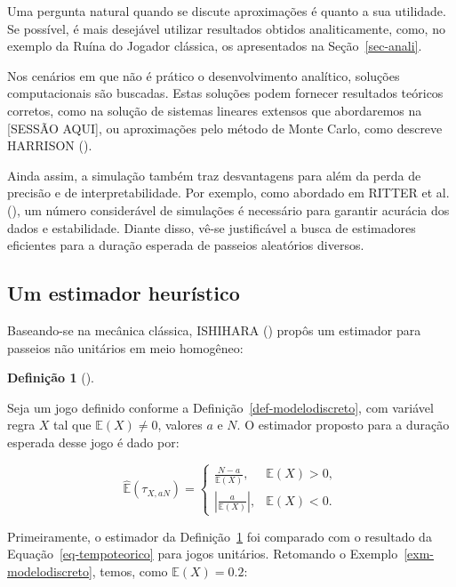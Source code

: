 \documentclass[
  brazilian,
  12pt,
]{article}
\theoremstyle{definition}
\theoremstyle{definition}
\newtheorem{definition}{Definição}[section]
\theoremstyle{remark}
\begin{document}
Uma pergunta natural quando se discute aproximações é quanto a sua
utilidade. Se possível, é mais desejável utilizar resultados obtidos
analiticamente, como, no exemplo da Ruína do Jogador clássica, os
apresentados na Seção~\ref{sec-anali}.

Nos cenários em que não é prático o desenvolvimento analítico, soluções
computacionais são buscadas. Estas soluções podem fornecer resultados
teóricos corretos, como na solução de sistemas lineares extensos que
abordaremos na {[}SESSÃO AQUI{]}, ou aproximações pelo método de Monte
Carlo, como descreve HARRISON
().

Ainda assim, a simulação também traz desvantagens para além da perda de
precisão e de interpretabilidade. Por exemplo, como abordado em RITTER
et al. (), um número
considerável de simulações é necessário para garantir acurácia dos dados
e estabilidade. Diante disso, vê-se justificável a busca de estimadores
eficientes para a duração esperada de passeios aleatórios diversos.

\subsection{Um estimador heurístico}\label{um-estimador-heuruxedstico}

Baseando-se na mecânica clássica, ISHIHARA
() propôs um estimador para
passeios não unitários em meio homogêneo:

\begin{definition}[]\protect\hypertarget{def-estimadorsimples}{}\label{def-estimadorsimples}

Seja um jogo definido conforme a Definição~\ref{def-modelodiscreto}, com
variável regra \(X\) tal que \(\mathbb{E}(X) \neq 0\), valores \(a\) e
\(N\). O estimador proposto para a duração esperada desse jogo é dado
por:

\[
\hat{\mathbb{E}}(\tau_{X, a N}) = \begin{cases}
\frac{N-a}{\mathbb{E}(X)},  & \mathbb{E}(X) > 0, \\
\left \lvert \frac{a}{\mathbb{E}(X)} \right \rvert,  & \mathbb{E}(X) < 0.
\end{cases}
\]

\end{definition}

Primeiramente, o estimador da Definição~\ref{def-estimadorsimples} foi
comparado com o resultado da Equação~\ref{eq-tempoteorico} para jogos
unitários. Retomando o Exemplo~\ref{exm-modelodiscreto}, temos, como
\(\mathbb{E}(X) = 0.2\):
\end{document}
